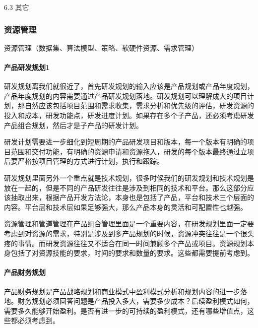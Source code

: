 \documentclass[letterpaper,11pt,english]{sphinxmanual}
\begin{document}
6.3 其它


\subsubsection{资源管理}
\label{\detokenize{chapter_skill/resource_manage:id1}}\label{\detokenize{chapter_skill/resource_manage::doc}}
资源管理（数据集、算法模型、策略、软硬件资源、需求管理）


\paragraph{产品研发规划1\sphinxfootnotemark[201]}
\label{\detokenize{chapter_skill/resource_manage:id2}}%
\begin{footnotetext}[201]\sphinxAtStartFootnote
{}
%
\end{footnotetext}\ignorespaces 
研发规划离我们就很近了，首先研发规划的输入应该是产品规划或产品年度规划，产品年度规划的内容需要通过产品研发规划落地。研发规划可以理解成大的项目计划，那自然应该包括项目范围和需求收集，需求分析和优先级的评估，研发资源的投入和成本，研发功能点，研发进度计划。如果存在多个子产品，还必须考虑研发产品组合规划，然后才是子产品的研发计划。

研发计划需要进一步细化到短周期的产品研发项目和版本，每一个版本有明确的项目范围和交付功能，有明确的资源申请和资源拖入，研发的每个版本最终通过立项后要严格按项目管理的方式进行计划，执行和跟踪。

研发规划里面另外一个重点就是技术规划，很多时候我们的研发规划和技术规划是放在一起的，但是不同的产品研发往往是涉及到相同的技术和平台。那么这部分应该抽取出来，根据产品开发方法论，本身也是包括了产品，平台和技术三个层面的内容。平台层和技术层如果足够强大，那么产品本身的灵活和可配置性也越强。

资源管理和管道管理在产品组合管理里面是一个重要内容，在研发规划里面一定要考虑到对资源的需求，特别是涉及到多产品规划的时候，资源冲突往往是一个很头疼的事情。而研发资源往往又不适合在同一时间兼顾多个产品或项目。资源规划本身包括了对资源技能的要求，时间的要求和数量的要求。这些都需要提前考虑到。


\paragraph{产品财务规划}
\label{\detokenize{chapter_skill/resource_manage:id3}}
产品财务规划是产品战略规划和商业模式中盈利模式分析和规划内容的进一步落地。财务规划必须回答问题是产品投入多大，需要多少成本？后续盈利模式如何，需要多久能够开始盈利。是否有进一步的可持续的盈利模式，还有哪些增值点，这些都必须考虑到。
\end{document}
